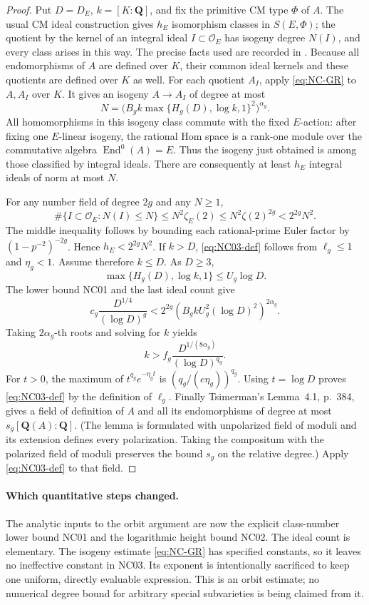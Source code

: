 \begin{proof}
Put $D=D_E$, $k=[K:\mathbf Q]$, and fix the primitive CM type $\Phi$
of $A$.  The usual CM ideal construction gives $h_E$ isomorphism
classes in $S(E,\Phi)$; the quotient by the kernel of an integral ideal
$I\subset\mathcal O_E$ has isogeny degree $N(I)$, and every class
arises in this way.  The precise facts used are recorded in
\cite[\S2.2, p.~382, proof of Proposition~2.2]{NC-Tsimerman2018}.
Because all endomorphisms of $A$ are defined over $K$, their common
ideal kernels and these quotients are defined over $K$ as well.
For each quotient $A_I$, apply \eqref{eq:NC-GR} to $A,A_I$ over $K$.
It gives an isogeny $A\to A_I$ of degree at most
\[
 N=\bigl(B_gk\max\{H_g(D),\log k,1\}^{2}\bigr)^{\alpha_g}.
\]
All homomorphisms in this isogeny class commute with the fixed
$E$-action: after fixing one $E$-linear isogeny, the rational Hom space
is a rank-one module over the commutative algebra
$\operatorname{End}^0(A)=E$.  Thus the isogeny just obtained is among
those classified by integral ideals.  There are consequently at least
$h_E$ integral ideals of norm at most $N$.

For any number field of degree $2g$ and any $N\geq1$,
\[
 \#\{I\subset\mathcal O_E:N(I)\leq N\}
 \leq N^2\zeta_E(2)
 \leq N^2\zeta(2)^{2g}<2^{2g}N^2.
\]
The middle inequality follows by bounding each rational-prime Euler
factor by $(1-p^{-2})^{-2g}$.  Hence $h_E<2^{2g}N^2$.
If $k>D$, \eqref{eq:NC03-def} follows from $\ell_g\leq1$ and
$\eta_g<1$.  Assume therefore $k\leq D$.  As $D\geq3$,
\[
 \max\{H_g(D),\log k,1\}\leq U_g\log D.
\]
The lower bound NC01 and the last ideal count give
\[
 c_g\frac{D^{1/4}}{(\log D)^g}
 <2^{2g}(B_gkU_g^2(\log D)^2)^{2\alpha_g}.
\]
Taking $2\alpha_g$-th roots and solving for $k$ yields
\[
 k>f_g\frac{D^{1/(8\alpha_g)}}{(\log D)^{q_g}}.
\]
For $t>0$, the maximum of $t^{q_g}e^{-\eta_gt}$ is
$(q_g/(e\eta_g))^{q_g}$.  Using $t=\log D$ proves
\eqref{eq:NC03-def} by the definition of $\ell_g$.
Finally Tsimerman's Lemma~4.1, p.~384, gives a field of definition of
$A$ and all its endomorphisms of degree at most
$s_g[\mathbf Q(A):\mathbf Q]$.  (The lemma is formulated with
unpolarized field of moduli and its extension defines every
polarization.  Taking the compositum with the polarized field of
moduli preserves the bound $s_g$ on the relative degree.)
Apply \eqref{eq:NC03-def} to that field.
\end{proof}

\paragraph{Which quantitative steps changed.}
The analytic inputs to the orbit argument are now the explicit
class-number lower bound NC01 and the logarithmic height bound NC02.
The ideal count is elementary.  The isogeny estimate
\eqref{eq:NC-GR} has specified constants, so it leaves no ineffective
constant in NC03.  Its exponent is intentionally sacrificed to keep
one uniform, directly evaluable expression.  This is an orbit estimate;
no numerical degree bound for arbitrary special subvarieties is being
claimed from it.

